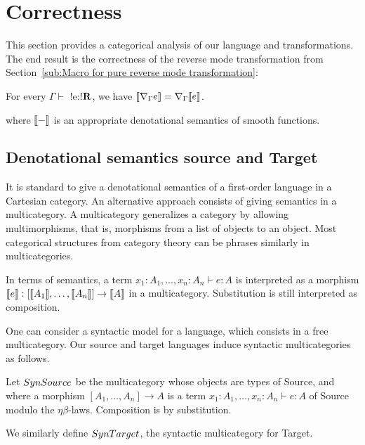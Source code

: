 \section{Correctness}
\label{sec:correctness}

This section provides a categorical analysis of our language and transformations.
The end result is the correctness of the reverse mode transformation from Section~\ref{sub:Macro for pure reverse mode transformation}:

 \begin{theorem}
     For every $\Gamma \vdash$ !e:!$\mathbf{R}$, we have 
     $\llbracket \nabla_\Gamma e\rrbracket= \nabla_\Gamma\llbracket e\rrbracket$.
 \end{theorem}
where $\llbracket -\rrbracket$ is an appropriate denotational semantics of smooth functions.

\subsection{Denotational semantics source and Target} %
\label{sub:Denotational semantics source and Target}

It is standard to give a denotational semantics of a first-order language in a Cartesian category.
An alternative approach consists of giving semantics in a multicategory.
A multicategory generalizes a category by allowing multimorphisms, that is, morphisms from a list of objects to an object.
Most categorical structures from category theory can be phrases similarly in multicategories.

In terms of semantics, a term $x_1:A_1,\ldots,x_n:A_n\vdash e:A$ is interpreted as a morphism $\llbracket e\rrbracket:[\llbracket A_1\rrbracket,\ldots,\llbracket A_n\rrbracket]\to \llbracket A\rrbracket$ in a multicategory.
Substitution is still interpreted as composition. 

One can consider a syntactic model for a language, which consists in a free multicategory.
Our source and target languages induce syntactic multicategories as follows.

\begin{definition}
    Let $SynSource$ be the multicategory whose objects are types of Source, and where a morphism 
    $[A_1,\ldots,A_n]\to A$ is a term $x_1:A_1,\ldots,x_n:A_n\vdash e:A$ of Source modulo the $\eta\beta$-laws.
    Composition is by substitution.
\end{definition}

We similarly define $SynTarget$, the syntactic multicategory for Target.

